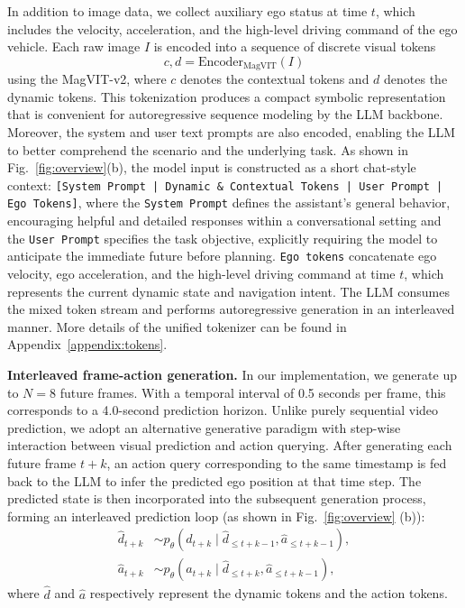 \documentclass[runningheads]{llncs}
\begin{document}
In addition to image data, we collect auxiliary ego status at time \(t\), which includes the velocity, acceleration, and the high-level driving command of the ego vehicle.
Each raw image \(I\) is encoded into a sequence of discrete visual tokens 
\begin{equation}
{c, d} = \mathrm{Encoder}_{\mathrm{MagVIT}}(I)
\end{equation}
using the MagVIT-v2, where \(c\) denotes the contextual tokens and \(d\) denotes the dynamic tokens. This tokenization produces a compact symbolic representation that is convenient for autoregressive sequence modeling by the LLM backbone. Moreover, the system and user text prompts are also encoded, enabling the LLM to better comprehend the scenario and the underlying task.
As shown in Fig.~\ref{fig:overview}(b), the model input is constructed as a short chat-style context:
\texttt{[System Prompt | Dynamic \& Contextual Tokens | User Prompt | Ego Tokens]},
where the \texttt{System Prompt} defines the assistant’s general behavior, encouraging helpful and detailed responses within a conversational setting  and the \texttt{User Prompt} specifies the task objective, explicitly requiring the model to anticipate the immediate future before planning. \texttt{Ego tokens} concatenate ego velocity, ego acceleration, and the high-level driving command at time $t$, which represents the current dynamic state and navigation intent. The LLM consumes the mixed token stream and performs autoregressive generation in an interleaved manner. More details of the unified tokenizer can be found in Appendix~\ref{appendix:tokens}.

\noindent\textbf{Interleaved frame-action generation.}
In our implementation, we generate up to \(N=8\) future frames. With a temporal interval of 0.5 seconds per frame, this corresponds to a 4.0-second prediction horizon. 
Unlike purely sequential video prediction, we adopt an alternative generative paradigm with step-wise interaction between visual prediction and action querying. After generating each future frame \(t+k\), an action query corresponding to the same timestamp is fed back to the LLM to infer the predicted ego position at that time step. The predicted state is then incorporated into the subsequent generation process, forming an interleaved prediction loop (as shown in Fig.~\ref{fig:overview} (b)):
\begin{align}
\hat d_{t+k} &\sim p_\theta(d_{t+k} \mid \hat d_{\le t+k-1}, \hat a_{\le t+k-1}), \\
\hat a_{t+k} &\sim p_\theta(a_{t+k} \mid \hat d_{\le t+k}, \hat a_{\le t+k-1}),
\end{align}
where \(\hat d\) and \(\hat a\) respectively represent the dynamic tokens and the action tokens.
\end{document}
